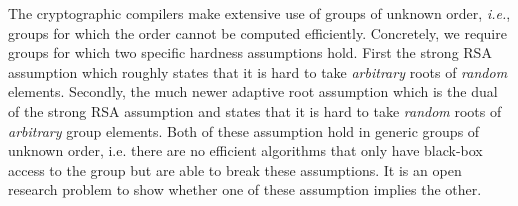\documentclass{article}
\theoremstyle{definition}
\begin{document}
The cryptographic compilers make extensive use of groups of unknown order, \emph{i.e.}, groups for which the order cannot be computed efficiently.
Concretely, we require groups for which two specific hardness assumptions hold.
First the strong RSA assumption\cite{CCS:CraSho99} which roughly states that it is hard to take \emph{arbitrary} roots of \emph{random} elements. Secondly, the much newer adaptive root assumption\cite{EC:Wesolowski19} which is the dual of the strong RSA assumption and states that it is hard to take \emph{random} roots of \emph{arbitrary} group elements. 
Both of these assumption hold in generic groups of unknown order\cite{genericunknown,C:BonBunFis19}, i.e. there are no efficient algorithms that only have black-box access to the group but are able to break these assumptions. 
It is an open research problem to show whether one of these assumption implies the other.
\end{document}
